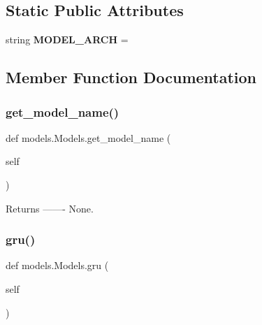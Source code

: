 \subsection*{Static Public Attributes}
\begin{DoxyCompactItemize}
\item 
\mbox{\label{classmodels_1_1Models_a0d1256f3e0cd2fa25209d1e42badd050}} 
string {\bfseries M\+O\+D\+E\+L\+\_\+\+A\+R\+CH} = \textquotesingle{}\textquotesingle{}
\end{DoxyCompactItemize}


\subsection{Member Function Documentation}
\mbox{\label{classmodels_1_1Models_a614dccfc44ed674cbe83fbdb3f8e7461}} 
\subsubsection{\texorpdfstring{get\+\_\+model\+\_\+name()}{get\_model\_name()}}
{\footnotesize\ttfamily def models.\+Models.\+get\+\_\+model\+\_\+name (\begin{DoxyParamCaption}\item[{}]{self }\end{DoxyParamCaption})}

\begin{DoxyVerb}Returns
-------
None.\end{DoxyVerb}
 \mbox{\label{classmodels_1_1Models_a74e3aab482c7db13cfe8b906c2fc69bd}} 
\subsubsection{\texorpdfstring{gru()}{gru()}}
{\footnotesize\ttfamily def models.\+Models.\+gru (\begin{DoxyParamCaption}\item[{}]{self }\end{DoxyParamCaption})}

